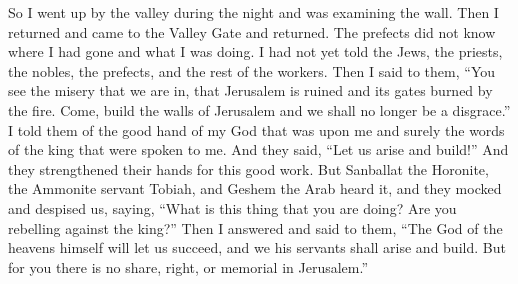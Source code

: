 \begin{biblechapter}
\verse So I went up by the valley during the night and was examining the wall. Then I returned and came to the Valley Gate and returned.
\verse The prefects did not know where I had gone and what I was doing. I had not yet told the Jews, the priests, the nobles, the prefects, and the rest of the workers.
\verse Then I said to them, “You see the misery that we are in, that Jerusalem is ruined and its gates burned by the fire. Come, build the walls of Jerusalem and we shall no longer be a disgrace.”
\verse I told them of the good hand of my God that was upon me and surely the words of the king that were spoken to me. And they said, “Let us arise and build!” And they strengthened their hands for this good work.
\verse But Sanballat the Horonite, the Ammonite servant Tobiah, and Geshem the Arab heard it, and they mocked and despised us, saying, “What is this thing that you are doing? Are you rebelling against the king?”
\verse Then I answered and said to them, “The God of the heavens himself will let us succeed, and we his servants shall arise and build. But for you there is no share, right, or memorial in Jerusalem.”
\end{biblechapter}

